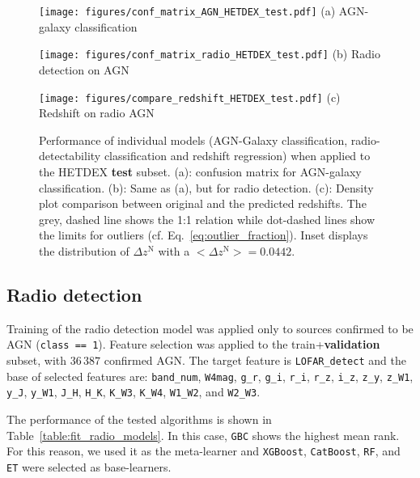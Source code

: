 \documentclass{aa}
\begin{document}
\begin{figure}
  \centering
  \begin{minipage}{0.49\columnwidth}
    \centering
    \texttt{[image: figures/conf\_matrix\_AGN\_HETDEX\_test.pdf]}\hfill\break
    {(a) AGN-galaxy classification}
  \end{minipage}%
  \begin{minipage}{0.49\columnwidth}
    \centering
    \texttt{[image: figures/conf\_matrix\_radio\_HETDEX\_test.pdf]}\hfill\break
    {(b) Radio detection on AGN}
  \end{minipage}\hfill\break%
  \begin{minipage}{0.70\columnwidth}
    \centering
    \texttt{[image: figures/compare\_redshift\_HETDEX\_test.pdf]}\hfill\break
    {(c) Redshift on radio AGN}
  \end{minipage}%
  \caption{Performance of individual models (AGN-Galaxy classification, radio-detectability classification and redshift regression) when applied to the HETDEX \textbf{test} subset. (a): confusion matrix for AGN-galaxy classification. 
  (b): Same as (a), but for radio detection. (c): Density plot comparison between original and the predicted redshifts. 
  The grey, dashed line shows the 1:1 relation while dot-dashed lines show the limits for outliers (cf. Eq.~\ref{eq:outlier_fraction}). Inset displays the distribution of $\Delta z^{\mathrm{N}}$ with a ${{<}\Delta z^{\mathrm{N}}{>} = 0.0442}$.}
  \label{fig:results_models_test}
\end{figure}

\subsection{Radio detection}\label{sec:results_radio}

Training of the radio detection model was applied only to sources confirmed to be AGN (\texttt{class == 1}).
Feature selection was applied to the train+\textbf{validation} subset, with $36\,387$ confirmed AGN. 
The target feature is \verb|LOFAR_detect| and the base of selected features are:  \verb|band_num|, \verb|W4mag|, \verb|g_r|, \verb|g_i|, \verb|r_i|, \verb|r_z|, \verb|i_z|, \verb|z_y|, \verb|z_W1|, \verb|y_J|, \verb|y_W1|, \verb|J_H|, \verb|H_K|, \verb|K_W3|, \verb|K_W4|, \verb|W1_W2|, and \verb|W2_W3|.

The performance of the tested algorithms is shown in Table~\ref{table:fit_radio_models}. 
In this case, \verb|GBC| shows the highest mean rank. For this reason, we used it as the meta-learner and \verb|XGBoost|, \verb|CatBoost|, \verb|RF|, and \verb|ET| were selected as base-learners.
\end{document}
